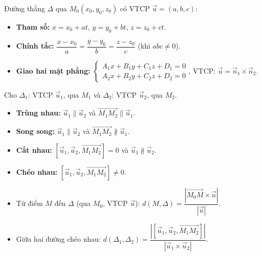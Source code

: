 \documentclass[12pt,a4paper]{article}
\begin{document}
\begin{dinhnghia}[title={Các dạng phương trình đường thẳng}]
  Đường thẳng $\Delta$ qua $M_0(x_0, y_0, z_0)$ có VTCP $\vec{u} = (a, b, c)$:
  \begin{itemize}
    \item \textbf{Tham số:} $x = x_0 + at$, $y = y_0 + bt$, $z = z_0 + ct$.
    \item \textbf{Chính tắc:} $\dfrac{x - x_0}{a} = \dfrac{y - y_0}{b} = \dfrac{z - z_0}{c}$ \;(khi $abc \ne 0$).
    \item \textbf{Giao hai mặt phẳng:} $\begin{cases} A_1 x + B_1 y + C_1 z + D_1 = 0 \\ A_2 x + B_2 y + C_2 z + D_2 = 0 \end{cases}$, VTCP: $\vec{u} = \vec{n}_1 \times \vec{n}_2$.
  \end{itemize}
\end{dinhnghia}

\begin{phuongphap}[title={Vị trí tương đối hai đường thẳng}]
  Cho $\Delta_1$: VTCP $\vec{u}_1$, qua $M_1$ và $\Delta_2$: VTCP $\vec{u}_2$, qua $M_2$.
  \begin{itemize}
    \item \textbf{Trùng nhau:} $\vec{u}_1 \parallel \vec{u}_2$ và $\overrightarrow{M_1 M_2} \parallel \vec{u}_1$.
    \item \textbf{Song song:} $\vec{u}_1 \parallel \vec{u}_2$ và $\overrightarrow{M_1 M_2} \not\parallel \vec{u}_1$.
    \item \textbf{Cắt nhau:} $[\vec{u}_1, \vec{u}_2, \overrightarrow{M_1 M_2}] = 0$ và $\vec{u}_1 \not\parallel \vec{u}_2$.
    \item \textbf{Chéo nhau:} $[\vec{u}_1, \vec{u}_2, \overrightarrow{M_1 M_2}] \ne 0$.
  \end{itemize}
\end{phuongphap}

\begin{congthuc}[title={Khoảng cách}]
  \begin{itemize}
    \item Từ điểm $M$ đến $\Delta$ (qua $M_0$, VTCP $\vec{u}$): $d(M, \Delta) = \dfrac{|\overrightarrow{M_0 M} \times \vec{u}|}{|\vec{u}|}$.
    \item Giữa hai đường chéo nhau: $d(\Delta_1, \Delta_2) = \dfrac{|[\vec{u}_1, \vec{u}_2, \overrightarrow{M_1 M_2}]|}{|\vec{u}_1 \times \vec{u}_2|}$.
  \end{itemize}
\end{congthuc}
\end{document}
